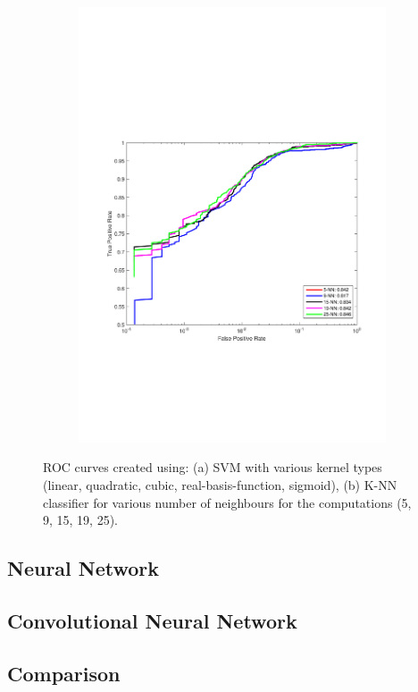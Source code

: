 \begin{figure}[h]
\begin{subfigure}[b]{0.49\textwidth}
    \includegraphics[width=\textwidth]{figures/K_NN.pdf}
    \caption{}
    \label{fig:K_NN}
  \end{subfigure}
  \caption{ROC curves created using: (a) SVM with various kernel types (linear, quadratic, cubic, real-basis-function, sigmoid), (b) K-NN classifier for various number of neighbours for the computations (5, 9, 15, 19, 25).}
\end{figure}

\subsection{Neural Network}
\subsection{Convolutional Neural Network}
\subsection{Comparison}